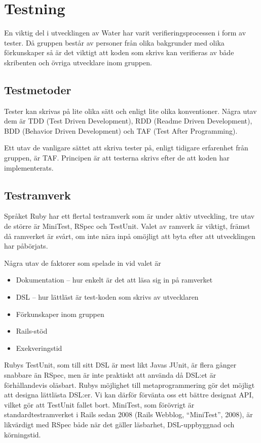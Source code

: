 \section{Testning}
En viktig del i utvecklingen av Water har varit verifieringsprocessen i form av tester. Då gruppen består av personer från olika bakgrunder med olika förkunskaper så är det viktigt att koden som skrivs kan verifieras av både skribenten och övriga utvecklare inom gruppen.

\subsection{Testmetoder}
Tester kan skrivas på lite olika sätt och enligt lite olika konventioner. Några utav dem är TDD (Test Driven Development), RDD (Readme Driven Development), BDD (Behavior Driven Development) och TAF (Test After Programming).

Ett utav de vanligare sättet att skriva tester på, enligt tidigare erfarenhet från gruppen, är TAF. Principen är att testerna skrivs efter de att koden har implementerats.

\subsection{Testramverk}
Språket Ruby har ett flertal testramverk som är under aktiv utveckling, tre utav de större är MiniTest, RSpec och TestUnit. Valet av ramverk är viktigt, främst då ramverket är svårt, om inte nära inpå omöjligt att byta efter att utvecklingen har påbörjats.

Några utav de faktorer som spelade in vid valet är
\begin{itemize}
    \item Dokumentation – hur enkelt är det att läsa sig in på ramverket
    \item DSL – hur lättläst är test-koden som skrivs av utvecklaren
    \item Förkunskaper inom gruppen
    \item Rails-stöd
    \item Exekveringstid
\end{itemize}

Rubys TestUnit, som till sitt DSL är mest likt Javas JUnit, är flera gånger snabbare än RSpec, men är inte praktiskt att använda då DSL:et är förhållandevis oläsbart. Rubys möjlighet till metaprogrammering gör det möjligt att designa lättlästa DSL:er. Vi kan därför förvänta oss ett bättre designat API, vilket gör att TestUnit fallet bort.
MiniTest, som förövrigt är standardtestramverket i Rails sedan 2008 (Rails Webblog, “MiniTest”, 2008), är likvärdigt med RSpec både när det gäller läsbarhet, DSL-uppbyggnad och körningstid.

